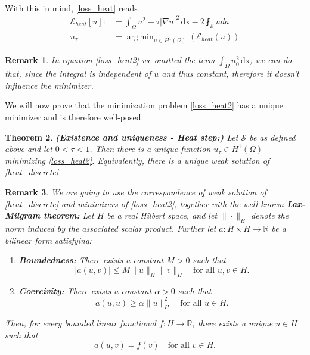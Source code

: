 \documentclass[12pt,openany]{book}
\newcommand{\R}{\mathbb{R}}
\theoremstyle{plainnormal}
\newtheorem{theorem}{Theorem}[section]
\newtheorem{remark}[theorem]{Remark}
\theoremstyle{remark}
\DeclareMathOperator*{\argmin}{arg\,min}
\begin{document}
\\
With this in mind, \cref{loss_heat} reads
\begin{align}\label{loss_heat2}
    \mathcal{E}_{heat}[u] :&= \int_\Omega u^2 + \tau |\nabla u|^2 \,\mathrm{dx} - 2\fint_\mathcal{S} u da\\
    u_\tau &= \argmin_{u\in H^1(\Omega)} (\mathcal{E}_{heat}(u))
\end{align}
\begin{remark}
    In equation \eqref{loss_heat2} we omitted the term $\int_\Omega u_0 ^2 \,\mathrm{dx}$; we can do that, since the integral is independent of $u$ and thus constant, therefore it doesn't influence the minimizer. 
\end{remark}
We will now prove that the minimization problem \cref{loss_heat2} has a unique minimizer and is therefore well-posed.
\begin{theorem}\label{thm_exUniq_heat}{\textbf{(Existence and uniqueness - Heat step:)}}
Let $\mathcal{S}$ be as defined above and let $0 < \tau < 1$. Then there is a unique function $u_\tau \in H^1(\Omega)$ minimizing \cref{loss_heat2}. Equivalently, there is a unique weak solution of \eqref{heat_discrete}.
\end{theorem}
\begin{remark}
We are going to use the correspondence of weak solution of \cref{heat_discrete} and minimizers of \cref{loss_heat2}, together with the well-known \textbf{Lax-Milgram theorem:} Let \( H \) be a real Hilbert space, and let $\|\cdot\|_H$ denote the norm induced by the associated scalar product. Further let \( a : H \times H \to \mathbb{R} \) be a bilinear form satisfying:
\begin{enumerate}
  \item \textbf{Boundedness:} There exists a constant \( M > 0 \) such that
  \[
  |a(u, v)| \leq M \|u\|_H \|v\|_H \quad \text{for all } u, v \in H.
  \]
  
  \item \textbf{Coercivity:} There exists a constant \( \alpha > 0 \) such that
  \[
  a(u, u) \geq \alpha \|u\|_H^2 \quad \text{for all } u \in H.
  \]
\end{enumerate}
Then, for every bounded linear functional \( f : H \rightarrow\R \), there exists a unique \( u \in H \) such that
\[
a(u, v) = f(v) \quad \text{for all } v \in H.
\]
\end{remark}
\end{document}
